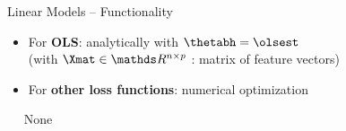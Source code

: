 \begin{vbframe}{Linear Models -- Functionality}
\begin{itemize}
  \item For \textbf{OLS}: analytically with 
  $\thetabh = \olsest$ \\
  (with $\Xmat \in \R^{n \times p}$ : matrix of feature vectors)
  \item For \textbf{other loss functions}: numerical optimization 
\end{itemize}

\medskip

 ~~ None

\medskip


\end{vbframe}


